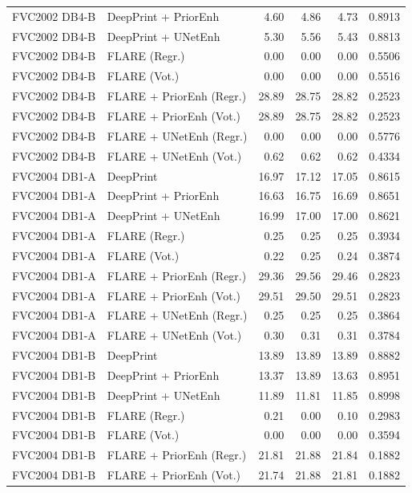 {\begin{longtable}{llrrrr}
FVC2002 DB4-B & DeepPrint + PriorEnh & 4.60 & 4.86 & 4.73 & 0.8913 \\
FVC2002 DB4-B & DeepPrint + UNetEnh & 5.30 & 5.56 & 5.43 & 0.8813 \\
FVC2002 DB4-B & FLARE (Regr.) & 0.00 & 0.00 & 0.00 & 0.5506 \\
FVC2002 DB4-B & FLARE (Vot.) & 0.00 & 0.00 & 0.00 & 0.5516 \\
FVC2002 DB4-B & FLARE + PriorEnh (Regr.) & 28.89 & 28.75 & 28.82 & 0.2523 \\
FVC2002 DB4-B & FLARE + PriorEnh (Vot.) & 28.89 & 28.75 & 28.82 & 0.2523 \\
FVC2002 DB4-B & FLARE + UNetEnh (Regr.) & 0.00 & 0.00 & 0.00 & 0.5776 \\
FVC2002 DB4-B & FLARE + UNetEnh (Vot.) & 0.62 & 0.62 & 0.62 & 0.4334 \\
\midrule
FVC2004 DB1-A & DeepPrint & 16.97 & 17.12 & 17.05 & 0.8615 \\
FVC2004 DB1-A & DeepPrint + PriorEnh & 16.63 & 16.75 & 16.69 & 0.8651 \\
FVC2004 DB1-A & DeepPrint + UNetEnh & 16.99 & 17.00 & 17.00 & 0.8621 \\
FVC2004 DB1-A & FLARE (Regr.) & 0.25 & 0.25 & 0.25 & 0.3934 \\
FVC2004 DB1-A & FLARE (Vot.) & 0.22 & 0.25 & 0.24 & 0.3874 \\
FVC2004 DB1-A & FLARE + PriorEnh (Regr.) & 29.36 & 29.56 & 29.46 & 0.2823 \\
FVC2004 DB1-A & FLARE + PriorEnh (Vot.) & 29.51 & 29.50 & 29.51 & 0.2823 \\
FVC2004 DB1-A & FLARE + UNetEnh (Regr.) & 0.25 & 0.25 & 0.25 & 0.3864 \\
FVC2004 DB1-A & FLARE + UNetEnh (Vot.) & 0.30 & 0.31 & 0.31 & 0.3784 \\
\midrule
FVC2004 DB1-B & DeepPrint & 13.89 & 13.89 & 13.89 & 0.8882 \\
FVC2004 DB1-B & DeepPrint + PriorEnh & 13.37 & 13.89 & 13.63 & 0.8951 \\
FVC2004 DB1-B & DeepPrint + UNetEnh & 11.89 & 11.81 & 11.85 & 0.8998 \\
FVC2004 DB1-B & FLARE (Regr.) & 0.21 & 0.00 & 0.10 & 0.2983 \\
FVC2004 DB1-B & FLARE (Vot.) & 0.00 & 0.00 & 0.00 & 0.3594 \\
FVC2004 DB1-B & FLARE + PriorEnh (Regr.) & 21.81 & 21.88 & 21.84 & 0.1882 \\
FVC2004 DB1-B & FLARE + PriorEnh (Vot.) & 21.74 & 21.88 & 21.81 & 0.1882 \\

\end{longtable}}
